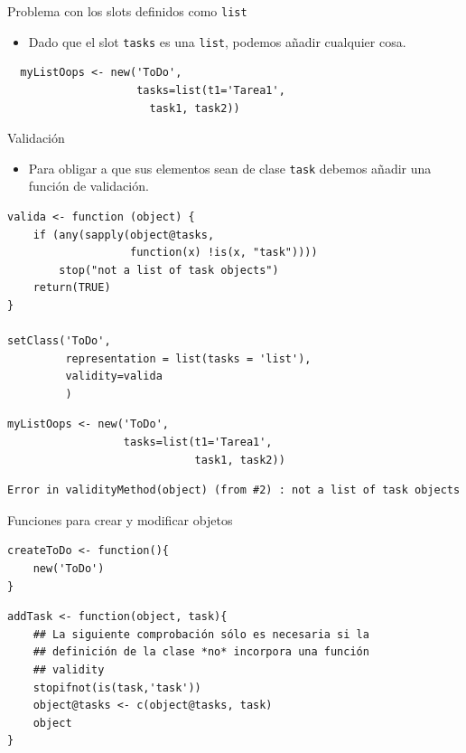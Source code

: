 \documentclass[xcolor={usenames,svgnames,dvipsnames}]{beamer}
\begin{document}
\begin{frame}[fragile,label={sec:orgheadline28}]{Problema con los slots definidos como \texttt{list}}
 \begin{itemize}
\item Dado que el slot \texttt{tasks} es una \texttt{list}, podemos añadir cualquier
cosa.
\end{itemize}
\lstset{language=R,label= ,caption= ,captionpos=b,numbers=none}
\begin{lstlisting}
  myListOops <- new('ToDo',
                    tasks=list(t1='Tarea1',
                      task1, task2))
\end{lstlisting}
\end{frame}

\begin{frame}[fragile,label={sec:orgheadline29}]{Validación}
 \begin{itemize}
\item Para obligar a que sus elementos sean de clase \texttt{task} debemos añadir
una función de validación.
\end{itemize}
\lstset{language=R,label= ,caption= ,captionpos=b,numbers=none}
\begin{lstlisting}
valida <- function (object) {
    if (any(sapply(object@tasks,
                   function(x) !is(x, "task")))) 
        stop("not a list of task objects")
    return(TRUE)
}

setClass('ToDo',
         representation = list(tasks = 'list'),
         validity=valida
         )
\end{lstlisting}

\lstset{language=R,label= ,caption= ,captionpos=b,numbers=none}
\begin{lstlisting}
myListOops <- new('ToDo',
                  tasks=list(t1='Tarea1',
                             task1, task2))
\end{lstlisting}

\begin{verbatim}
Error in validityMethod(object) (from #2) : not a list of task objects
\end{verbatim}
\end{frame}

\begin{frame}[fragile,label={sec:orgheadline30}]{Funciones para crear y modificar objetos}
 \lstset{language=R,label= ,caption= ,captionpos=b,numbers=none}
\begin{lstlisting}
createToDo <- function(){
    new('ToDo')
}
\end{lstlisting}

\lstset{language=R,label= ,caption= ,captionpos=b,numbers=none}
\begin{lstlisting}
addTask <- function(object, task){
    ## La siguiente comprobación sólo es necesaria si la
    ## definición de la clase *no* incorpora una función 
    ## validity
    stopifnot(is(task,'task'))
    object@tasks <- c(object@tasks, task)
    object
}
\end{lstlisting}
\end{frame}
\end{document}
